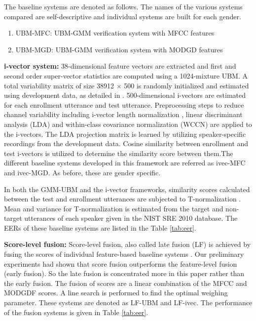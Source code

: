 \documentclass[preprint,12pt,5p]{elsarticle}
\begin{document}
The baseline systems are denoted as follows. The names of the various systems
compared are self-descriptive and individual systems are built for each gender.
\begin{enumerate}
\item UBM-MFC: UBM-GMM verification system with MFCC features
\item UBM-MGD: UBM-GMM verification system with MODGD features
\end{enumerate}

\textbf{i-vector system:} 
38-dimensional feature vectors are extracted and first and second order
super-vector statistics are computed using a 1024-mixture UBM. A total
variability matrix of size 38912 $\times$ 500 is randomly initialized and
estimated using development data, as detailed in \cite{dehak_ivector,
kenny_JFA}.  500-dimensional i-vectors are estimated for each enrollment
utterance and test utterance. Preprocessing steps to reduce channel variability
including i-vector length normalization \cite{garciaRomero}, linear discriminant
analysis (LDA) and within-class covariance normalization (WCCN) are applied to
the i-vectors.  The LDA projection matrix is learned by utilizing
speaker-specific recordings from the development data. %
Cosine similarity between enrollment and test i-vectors is utilized to determine
the similarity score between them.The different baseline systems developed in
this framework are referred as ivec-MFC and ivec-MGD. As before, these are
gender specific.

In both the GMM-UBM and the i-vector frameworks, similarity
scores calculated between the test and enrollment utterances 
are subjected to T-normalization \cite{tnorm}. Mean and variance for T-normalization is
estimated from the target and non-target utterances of each speaker given in the 
NIST SRE 2010 database. The EERs of these baseline systems are listed in the Table \ref{tab:eer}.

\textbf{Score-level fusion:}  Score-level fusion, also called late fusion (LF)
is achieved by fusing the scores of individual feature-based baseline systems
\cite{fusion}. Our preliminary experiments had shown that score fusion outperforms 
the feature-level fusion (early fusion). So the late fusion is concentrated more in this paper 
rather than the early fusion. The fusion of scores are a linear 
combination of the MFCC and MODGDF scores. A line search is performed 
to find the optimal weighing parameter. These systems are denoted as LF-UBM 
and LF-ivec.  The performance of the fusion systems is given in Table \ref{tab:eer}. 
	
\end{document}
